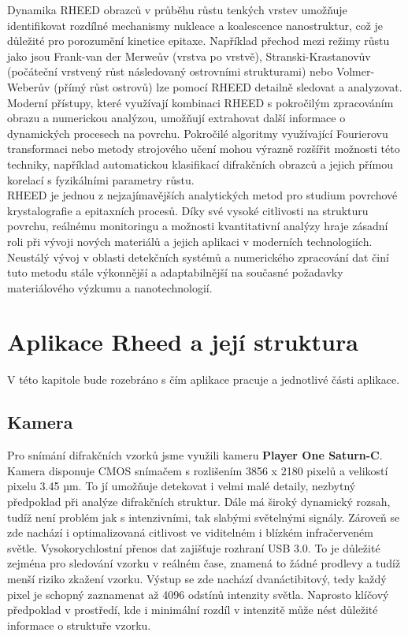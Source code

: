 \documentclass{article}
\begin{document}
Dynamika RHEED obrazců v průběhu růstu tenkých vrstev umožňuje identifikovat rozdílné mechanismy nukleace a koalescence nanostruktur, což je důležité pro porozumění kinetice epitaxe. Například přechod mezi režimy růstu jako jsou Frank-van der Merweův (vrstva po vrstvě), Stranski-Krastanovův (počáteční vrstvený růst následovaný ostrovními strukturami) nebo Volmer-Weberův (přímý růst ostrovů) lze pomocí RHEED detailně sledovat a analyzovat.\\

Moderní přístupy, které využívají kombinaci RHEED s pokročilým zpracováním obrazu a numerickou analýzou, umožňují extrahovat další informace o dynamických procesech na povrchu. Pokročilé algoritmy využívající Fourierovu transformaci nebo metody strojového učení mohou výrazně rozšířit možnosti této techniky, například automatickou klasifikací difrakčních obrazců a jejich přímou korelací s fyzikálními parametry růstu.\\

RHEED je jednou z nejzajímavějších analytických metod pro studium povrchové krystalografie a epitaxních procesů. Díky své vysoké citlivosti na strukturu povrchu, reálnému monitoringu a možnosti kvantitativní analýzy hraje zásadní roli při vývoji nových materiálů a jejich aplikaci v moderních technologiích. Neustálý vývoj v oblasti detekčních systémů a numerického zpracování dat činí tuto metodu stále výkonnější a adaptabilnější na současné požadavky materiálového výzkumu a nanotechnologií.\\

\section{Aplikace Rheed a její struktura}
    V této kapitole bude rozebráno s čím aplikace pracuje a jednotlivé části aplikace.
\subsection{Kamera}
Pro snímání difrakčních vzorků jsme využili kameru \textbf{Player One Saturn-C}. Kamera disponuje CMOS snímačem s rozlišením 3856 x 2180 pixelů a velikostí pixelu 3.45 µm. To jí umožňuje detekovat i velmi malé detaily, nezbytný předpoklad při analýze difrakčních struktur.
    Dále má široký dynamický rozsah, tudíž není problém jak s intenzivními, tak slabými světelnými signály. Zároveň se zde nachází i optimalizovaná citlivost ve viditelném i blízkém infračerveném světle.
    Vysokorychlostní přenos dat zajišťuje rozhraní USB 3.0. To je důležité zejména pro sledování vzorku v reálném čase, znamená to žádné prodlevy a tudíž menší riziko zkažení vzorku.
    Výstup se zde nachází dvanáctibitový, tedy každý pixel je schopný zaznamenat až 4096 odstínů intenzity světla. Naprosto klíčový předpoklad v prostředí, kde i minimální rozdíl v intenzitě může nést důležité informace o struktuře vzorku.
\newpage
\end{document}
